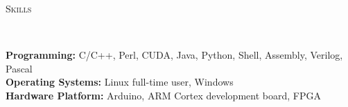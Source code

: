 \documentclass[a4paper, 12pt]{article}
\newenvironment{changemargin}[2]{%
  \begin{list}{}{%
      \setlength{\topsep}{0pt}%
      \setlength{\leftmargin}{#1}%
      \setlength{\rightmargin}{#2}%
      \setlength{\listparindent}{\parindent}%
      \setlength{\itemindent}{\parindent}%
      \setlength{\parsep}{\parskip}%
    }%
  \item[]}{\end{list}
}
\newcommand{\lineover}{
  \begin{changemargin}{-0.05in}{-0.05in}
    \vspace*{-8pt}
    \hrulefill \\
    \vspace*{-2pt}
  \end{changemargin}
}
\newcommand{\header}[1]{
  \begin{changemargin}{-0.5in}{-0.5in}
    \scshape{#1}\\
    \lineover
  \end{changemargin}
}
\newenvironment{body}
{
\vspace*{-16pt}
\begin{changemargin}{-0.25in}{-0.5in}
}	
{
\end{changemargin}
}
\begin{document}
\smallskip
\medskip
\header{Skills}
\begin{body}
  \vspace{14pt}
  \textbf{Programming:}{} C/C++, Perl, CUDA, Java, Python, Shell, Assembly, Verilog, Pascal\\
  \medskip
  \textbf{Operating Systems:}{} Linux full-time user, Windows\\
  \medskip
  \textbf{Hardware Platform:}{} Arduino, ARM Cortex development board, FPGA\\
\end{body}
\end{document}
